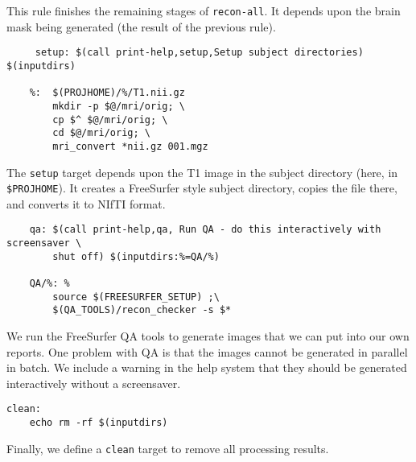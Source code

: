 This rule finishes the remaining stages of
\texttt{recon-all}. It depends upon the brain mask being generated
(the result of the previous rule).

\begin{lstlisting}
	 setup: $(call print-help,setup,Setup subject directories) $(inputdirs) 

	%:  $(PROJHOME)/%/T1.nii.gz 
		mkdir -p $@/mri/orig; \
		cp $^ $@/mri/orig; \
		cd $@/mri/orig; \
		mri_convert *nii.gz 001.mgz 
\end{lstlisting}

The \texttt{setup} target depends upon the T1 image in the subject
directory (here, in \texttt{\$PROJHOME}). It creates a FreeSurfer
style subject directory, copies the file there, and converts it to
NIfTI format. 

\begin{lstlisting}
	qa: $(call print-help,qa, Run QA - do this interactively with screensaver \
		shut off) $(inputdirs:%=QA/%)

	QA/%: %
		source $(FREESURFER_SETUP) ;\
		$(QA_TOOLS)/recon_checker -s $*
\end{lstlisting}

We run the FreeSurfer QA tools to generate images that we can put into
our own reports. One problem with QA is that the images cannot be
generated in parallel in batch. We include a warning in the help
system that they should be generated interactively without a
screensaver. 

\begin{lstlisting}
clean:
	echo rm -rf $(inputdirs)
\end{lstlisting}

Finally, we define a \texttt{clean} target to remove all processing
results. 
